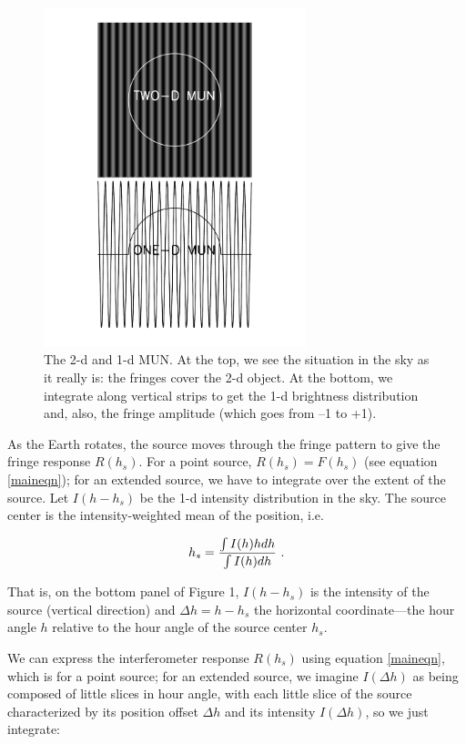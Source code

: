 \documentclass[11pt,preprint]{aastex}
\begin{document}
\begin{figure}[h!]
\begin{center}
\includegraphics[width=3.0in] {plots/interf_fig.pdf}
\end{center}
                                                                                
\caption{The 2-d and 1-d MUN. At the top, we see the situation in the
sky as it really is: the fringes cover the 2-d object.
At the bottom, we integrate along vertical strips to get the 1-d
brightness distribution and, also, the fringe amplitude (which goes from
--1 to +1). 
\label{interf_fig} } \end{figure}

As the Earth rotates, the source moves through the fringe pattern to
give the fringe response $R(h_s)$. For a point source, $R(h_s)= F(h_s)$
(see equation \ref{maineqn}); for an extended source, we have to
integrate over the extent of the source.  Let $I(h - h_s)$ be the 1-d
intensity distribution in the sky. 
The source center is the intensity-weighted mean of the
position, i.e.

\begin{equation}
h_s = { \int I(h)h dh \over \int I(h) dh} \ .
\end{equation}

\noindent That is, on the bottom panel of
Figure 1, $I(h - h_s)$ is the intensity of the source (vertical
direction) and $\Delta h= h -h_s$ the horizontal coordinate---the hour
angle $h$ relative to the hour angle of the source center $h_s$. 


We can express the interferometer response $R(h_s)$ using equation
\ref{maineqn}, which is for a point source; for an extended source, we
imagine $I(\Delta h)$ as being composed of little slices in hour angle,
with each little slice of the source characterized by its position
offset $\Delta h$ and its intensity $I(\Delta h)$, so we just integrate:
\end{document}

